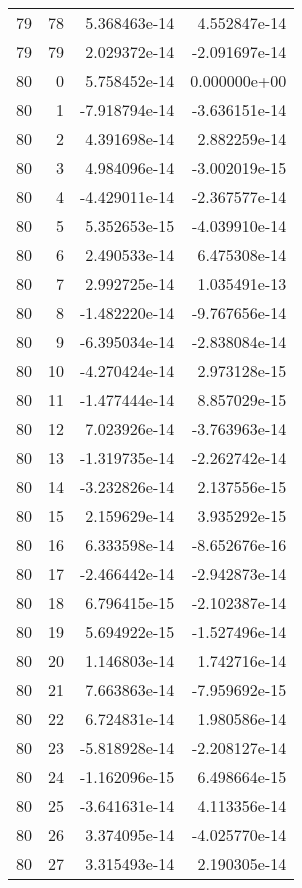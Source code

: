 \begin{tabular}{rrrr}
  79 &   78 &  5.368463e-14 &  4.552847e-14 \\
  79 &   79 &  2.029372e-14 & -2.091697e-14 \\
  80 &    0 &  5.758452e-14 &  0.000000e+00 \\
  80 &    1 & -7.918794e-14 & -3.636151e-14 \\
  80 &    2 &  4.391698e-14 &  2.882259e-14 \\
  80 &    3 &  4.984096e-14 & -3.002019e-15 \\
  80 &    4 & -4.429011e-14 & -2.367577e-14 \\
  80 &    5 &  5.352653e-15 & -4.039910e-14 \\
  80 &    6 &  2.490533e-14 &  6.475308e-14 \\
  80 &    7 &  2.992725e-14 &  1.035491e-13 \\
  80 &    8 & -1.482220e-14 & -9.767656e-14 \\
  80 &    9 & -6.395034e-14 & -2.838084e-14 \\
  80 &   10 & -4.270424e-14 &  2.973128e-15 \\
  80 &   11 & -1.477444e-14 &  8.857029e-15 \\
  80 &   12 &  7.023926e-14 & -3.763963e-14 \\
  80 &   13 & -1.319735e-14 & -2.262742e-14 \\
  80 &   14 & -3.232826e-14 &  2.137556e-15 \\
  80 &   15 &  2.159629e-14 &  3.935292e-15 \\
  80 &   16 &  6.333598e-14 & -8.652676e-16 \\
  80 &   17 & -2.466442e-14 & -2.942873e-14 \\
  80 &   18 &  6.796415e-15 & -2.102387e-14 \\
  80 &   19 &  5.694922e-15 & -1.527496e-14 \\
  80 &   20 &  1.146803e-14 &  1.742716e-14 \\
  80 &   21 &  7.663863e-14 & -7.959692e-15 \\
  80 &   22 &  6.724831e-14 &  1.980586e-14 \\
  80 &   23 & -5.818928e-14 & -2.208127e-14 \\
  80 &   24 & -1.162096e-15 &  6.498664e-15 \\
  80 &   25 & -3.641631e-14 &  4.113356e-14 \\
  80 &   26 &  3.374095e-14 & -4.025770e-14 \\
  80 &   27 &  3.315493e-14 &  2.190305e-14 \\

\end{tabular}
